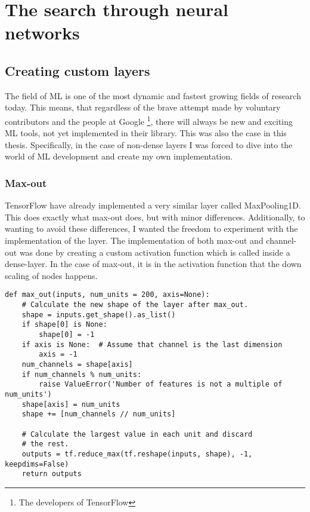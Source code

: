 \section{The search through neural networks}
\subsection{Creating custom layers}
The field of \ac{ML} is one of the most dynamic and fastest growing fields of research
today. This means, that regardless of the brave attempt made by voluntary contributors and
the people at Google \footnote{The developers of TensorFlow}, there will always be 
new and exciting \ac{ML} tools, not yet implemented in their library. This was also 
the case in this thesis. Specifically, in the case of non-dense layers I was forced
to dive into the world of \ac{ML} development and create my own implementation. 
\subsubsection*{Max-out}
TensorFlow have already implemented a very similar layer called MaxPooling1D. This does 
exactly what max-out does, but with minor differences. Additionally, to wanting to avoid 
these differences, I wanted the freedom to experiment with the implementation of the 
layer. The implementation of both max-out and channel-out was done by creating a custom 
activation function which is called inside a dense-layer. In the case of max-out, it is 
in the activation function that the down scaling of nodes happens. 
\lstset{style=Python}
\begin{lstlisting}[caption={Python-file for calling dataframe and calculating $M_{lll}$.},captionpos=b, label={lst:max_out}]
def max_out(inputs, num_units = 200, axis=None):
    # Calculate the new shape of the layer after max_out.
    shape = inputs.get_shape().as_list()
    if shape[0] is None:
        shape[0] = -1
    if axis is None:  # Assume that channel is the last dimension
        axis = -1
    num_channels = shape[axis]
    if num_channels % num_units:
        raise ValueError('Number of features is not a multiple of num_units')
    shape[axis] = num_units
    shape += [num_channels // num_units]

    # Calculate the largest value in each unit and discard 
    # the rest. 
    outputs = tf.reduce_max(tf.reshape(inputs, shape), -1, keepdims=False)
    return outputs    
\end{lstlisting}
